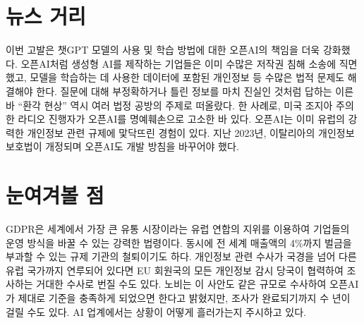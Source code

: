 \documentclass{translation}
\begin{document}
\section{뉴스 거리}
% 

이번 고발은 챗GPT 모델의 사용 및 학습 방법에 대한 오픈AI의 책임을 더욱 강화했다.
오픈AI처럼 생성형 AI를 제작하는 기업들은 이미 수많은 저작권 침해 소송에 직면했고, 모델을 학습하는 데 사용한 데이터에 포함된 개인정보 등 수많은 법적 문제도 해결해야 한다.
질문에 대해 부정확하거나 틀린 정보를 마치 진실인 것처럼 답하는 이른바 ``환각 현상'' 역시 여러 법정 공방의 주제로 떠올랐다.
한 사례로, 미국 조지아 주의 한 라디오 진행자가 오픈AI를 명예훼손으로 고소한 바 있다.
오픈AI는 이미 유럽의 강력한 개인정보 관련 규제에 맟닥뜨린 경험이 있다.
지난 2023년, 이탈리아의 개인정보 보호법이 개정되며 오픈AI도 개발 방침을 바꾸어야 했다.
% 

\section{눈여겨볼 점}
% 

GDPR은 세계에서 가장 큰 유통 시장이라는 유럽 연합의 지위를 이용하여 기업들의 운영 방식을 바꿀 수 있는 강력한 법령이다.
동시에 전 세계 매출액의 4\%까지 벌금을 부과할 수 있는 규제 기관의 철퇴이기도 하다.
개인정보 관련 수사가 국경을 넘어 다른 유럽 국가까지 연루되어 있다면 EU 회원국의 모든 개인정보 감시 당국이 협력하여 조사하는 거대한 수사로 번질 수도 있다.
노비는 이 사안도 같은 규모로 수사하여 오픈AI가 제대로 기준을 충족하게 되었으면 한다고 밝혔지만, 조사가 완료되기까지 수 년이 걸릴 수도 있다.
AI 업계에서는 상황이 어떻게 흘러가는지 주시하고 있다.
% 
\end{document}
